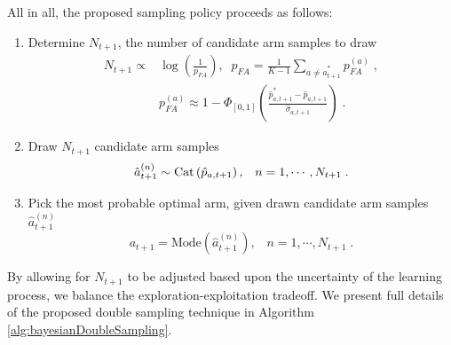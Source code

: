 \documentclass{article}
\newcommand{\Cat}[1]{{\rm Cat}\left( #1\right)}
\begin{document}
All in all, the proposed sampling policy proceeds as follows:
\begin{enumerate}
	\item Determine $N_{t+1}$, the number of candidate arm samples to draw
		\begin{equation}
		\begin{split}
		N_{t+1} \propto & \log\left(\frac{1}{p_{FA}}\right), \; \; p_{FA}=\frac{1}{K-1}\sum_{a \neq \hat{a}_{t+1}^*}p_{FA}^{(a)}\;, \\
		& p_{FA}^{(a)} \approx 1- \Phi_{[0,1]}\left(\frac{\hat{p}^*_{a,{t+1}}-\hat{p}_{a,t+1}}{\hat{\sigma}_{a,t+1}}\right) \; .
		\end{split}
		\label{eq:policy_n_samples}
		\end{equation}
	\item Draw $N_{t+1}$ candidate arm samples
	\begin{equation}
	\hat{a}_{t+1}^{(n)} \sim \Cat{\hat{p}_{a,t+1}}, \; \; \;  n=1,\cdots, N_{t+1} \; .
	\end{equation}
	\item Pick the most probable optimal arm, given drawn candidate arm samples $\hat{a}_{t+1}^{(n)}$
	\begin{equation}
	a_{t+1} = \text{Mode}\left(\hat{a}_{t+1}^{(n)}\right), \; \; \; n=1,\cdots,N_{t+1} \;.
	\end{equation}
\end{enumerate}

By allowing for $N_{t+1}$ to be adjusted based upon the uncertainty of the learning process, we balance the exploration-exploitation tradeoff. We present full details of the proposed double sampling technique in Algorithm \autoref{alg:bayesianDoubleSampling}.
\end{document}
